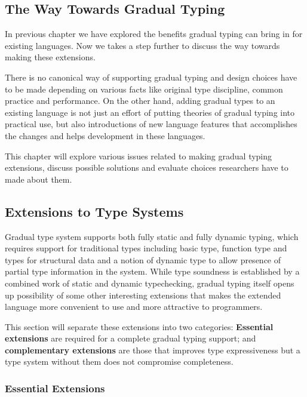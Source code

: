 

\subsection{The Way Towards Gradual Typing}


In previous chapter we have explored the benefits gradual typing
can bring in for existing languages.
Now we takes a step further to discuss the way towards making these extensions.

There is no canonical way of supporting gradual typing and design choices have to be made
depending on various facts like original type discipline, common practice and performance.
On the other hand, adding gradual types to an existing language
is not just an effort of putting theories of gradual typing into practical use,
but also introductions of new language features that accomplishes the changes
and helps development in these languages.

This chapter will explore various issues related to making gradual typing extensions,
discuss possible solutions and evaluate choices researchers have to made about them. 

\subsection{Extensions to Type Systems}

Gradual type system supports both fully static and fully dynamic typing,
which requires support for traditional types including
basic type, function type and types for structural data
and a notion of dynamic type to allow presence of partial type information in the system.
While type soundness is established by a combined work of static and dynamic typechecking,
gradual typing itself opens up possibility of some other interesting extensions
that makes the extended language more convenient to use and more attractive to programmers.

This section will separate these extensions into two categories:
\textbf{Essential extensions} are required for a complete gradual typing support;
and \textbf{complementary extensions} are those that improves type expressiveness
but a type system without them does not compromise completeness.

\subsubsection{Essential Extensions}

